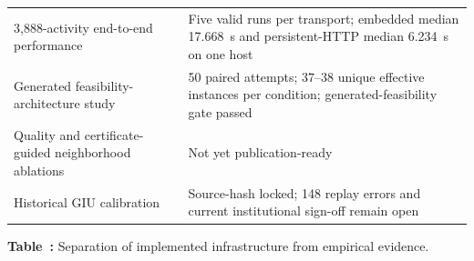 \begin{center}
\begin{tabular}{p{}p{}}
3,888-activity end-to-end performance & Five valid runs per transport; embedded median 17.668~s and persistent-HTTP median 6.234~s on one host \\
Generated feasibility-architecture study & 50 paired attempts; 37--38 unique effective instances per condition; generated-feasibility gate passed \\
Quality and certificate-guided neighborhood ablations & Not yet publication-ready \\
Historical GIU calibration & Source-hash locked; 148 replay errors and current institutional sign-off remain open \\
\bottomrule
\end{tabular}
\label{tab:evidence-status}
\par\smallskip
\footnotesize\textbf{Table~\thetable:} Separation of implemented infrastructure from empirical evidence.
\end{center}
